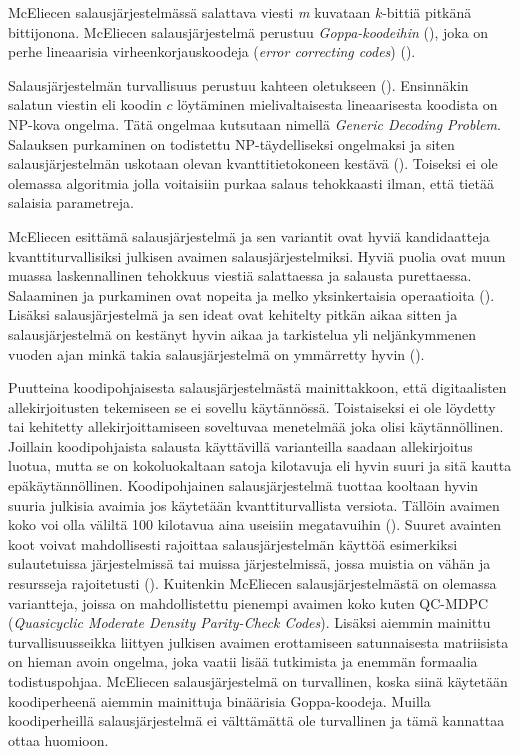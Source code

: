 McEliecen salausjärjestelmässä salattava viesti \emph{m} kuvataan $k$-bittiä pitkänä bittijonona. McEliecen salausjärjestelmä perustuu \emph{Goppa-koodeihin} (\cite{mceliece1978public}), joka on perhe lineaarisia virheenkorjauskoodeja (\emph{error correcting codes}) (\cite{8012331}).

Salausjärjestelmän turvallisuus perustuu kahteen oletukseen (\cite{repka2014overview}). Ensinnäkin salatun viestin eli koodin $c$ löytäminen mielivaltaisesta lineaarisesta koodista on NP-kova ongelma. Tätä ongelmaa kutsutaan nimellä \emph{Generic Decoding Problem}. Salauksen purkaminen on todistettu NP-täydelliseksi ongelmaksi ja siten salausjärjestelmän uskotaan olevan kvanttitietokoneen kestävä (\cite{8012331}). Toiseksi ei ole olemassa algoritmia jolla voitaisiin purkaa salaus tehokkaasti ilman, että tietää salaisia parametreja.

McEliecen esittämä salausjärjestelmä ja sen variantit ovat hyviä kandidaatteja kvanttiturvallisiksi julkisen avaimen salausjärjestelmiksi. Hyviä puolia ovat muun muassa laskennallinen tehokkuus viestiä salattaessa ja salausta purettaessa. Salaaminen ja purkaminen ovat nopeita ja melko yksinkertaisia operaatioita (\cite{mavroeidis2018impact}). Lisäksi salausjärjestelmä ja sen ideat ovat kehitelty pitkän aikaa sitten ja salausjärjestelmä on kestänyt hyvin aikaa ja tarkistelua yli neljänkymmenen vuoden ajan minkä takia salausjärjestelmä on ymmärretty hyvin (\cite{8012331}).

Puutteina koodipohjaisesta salausjärjestelmästä mainittakkoon, että digitaalisten allekirjoitusten tekemiseen se ei sovellu käytännössä. Toistaiseksi ei ole löydetty tai kehitetty allekirjoittamiseen soveltuvaa menetelmää joka olisi käytännöllinen. Joillain koodipohjaista salausta käyttävillä varianteilla saadaan allekirjoitus luotua, mutta se on kokoluokaltaan satoja kilotavuja eli hyvin suuri ja sitä kautta epäkäytännöllinen. Koodipohjainen salausjärjestelmä tuottaa kooltaan hyvin suuria julkisia avaimia jos käytetään kvanttiturvallista versiota. Tällöin avaimen koko voi olla väliltä 100 kilotavua aina useisiin megatavuihin (\cite{mavroeidis2018impact}). Suuret avainten koot voivat mahdollisesti rajoittaa salausjärjestelmän käyttöä esimerkiksi sulautetuissa järjestelmissä tai muissa järjestelmissä, jossa muistia on vähän ja resursseja rajoitetusti (\cite{8012331}). Kuitenkin McEliecen salausjärjestelmästä on olemassa variantteja, joissa on mahdollistettu pienempi avaimen koko kuten QC-MDPC (\emph{Quasicyclic Moderate Density Parity-Check Codes}). Lisäksi aiemmin mainittu turvallisuusseikka liittyen julkisen avaimen erottamiseen satunnaisesta matriisista on hieman avoin ongelma, joka vaatii lisää tutkimista ja enemmän formaalia todistuspohjaa. McEliecen salausjärjestelmä on turvallinen, koska siinä käytetään koodiperheenä aiemmin mainittuja binäärisia Goppa-koodeja. Muilla koodiperheillä salausjärjestelmä ei välttämättä ole turvallinen ja tämä kannattaa ottaa huomioon.

